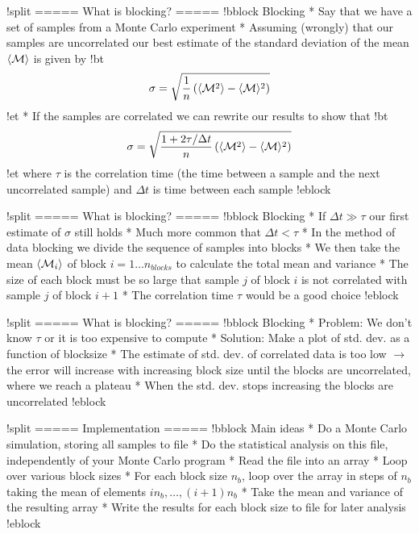 




!split
===== What is blocking? =====
!bblock Blocking
    * Say that we have a set of samples from a Monte Carlo experiment
    * Assuming (wrongly) that our samples are uncorrelated our best estimate of the standard deviation of the mean $\langle {\cal M}\rangle$ is given by
   !bt   
   \[
        \sigma=\sqrt{\frac{1}{n}\left(\langle {\cal M}^2\rangle-\langle {\cal M}\rangle^2\right)} 
      \]
!et
    * If the samples are correlated we can rewrite our results to show  that
!bt      
\[
        \sigma=\sqrt{\frac{1+2\tau/\Delta
            t}{n}\left(\langle {\cal M}^2\rangle-\langle {\cal M}\rangle^2\right)}
      \]
!et
      where $\tau$ is the correlation time (the time between a sample and the next uncorrelated sample) and $\Delta t$ is time between each sample
!eblock    

!split
===== What is blocking? =====
!bblock Blocking 
    * If $\Delta t\gg\tau$ our first estimate of $\sigma$ still holds
    * Much more common that $\Delta t<\tau$
    * In the method of data blocking we divide the sequence of samples into blocks
    * We then take the mean $\langle {\cal M}_i\rangle$ of block $i=1\ldots n_{blocks}$ to calculate the total mean and variance
    * The size of each block must be so large that sample $j$ of block $i$ is not correlated with sample $j$ of block $i+1$
    * The correlation time $\tau$ would be a good choice
!eblock

!split
===== What is blocking? =====
!bblock Blocking
    * Problem: We don't know $\tau$ or it is too expensive to compute
    * Solution: Make a plot of std. dev. as a function of blocksize
    * The estimate of std. dev. of correlated data is too low $\to$ the error will increase with increasing block size until the blocks are uncorrelated, where we reach a plateau
    * When the std. dev. stops increasing the blocks are uncorrelated
!eblock

!split
===== Implementation =====
!bblock Main ideas
    * Do a Monte Carlo simulation, storing all samples to file
    * Do the statistical analysis on this file, independently of your Monte Carlo program
    * Read the file into an array
    * Loop over various block sizes
    * For each block size $n_b$, loop over the array in steps of $n_b$ taking the mean of elements $i n_b,\ldots,(i+1) n_b$
    * Take the mean and variance of the resulting array
    * Write the results for each block size to file for later
      analysis
!eblock

